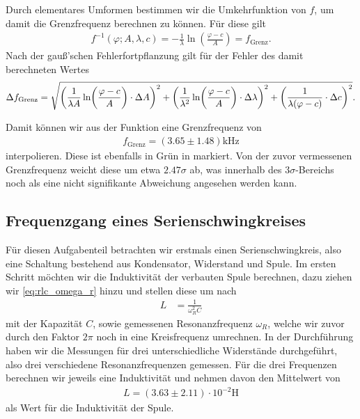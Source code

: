 Durch elementares Umformen bestimmen wir die Umkehrfunktion von $f$, um damit die Grenzfrequenz berechnen zu können. Für diese gilt
\begin{align}
  f^{-1}(\varphi; A, \lambda, c) = - \frac{1}{\lambda} \ln(\frac{\varphi - c}{A}) = f_{\mathrm{Grenz}}.
\end{align}
Nach der gauß'schen Fehlerfortpflanzung gilt für der Fehler des damit berechneten Wertes
\begin{align}
  \Delta f_{\mathrm{Grenz}} = \sqrt{\qty(\frac{1}{\lambda A} \ln(\frac{\varphi - c}{A}) \cdot \Delta A)^{2} + \qty(\frac{1}{\lambda^2} \ln(\frac{\varphi - c}{A}) \cdot \Delta \lambda)^{2} + \qty(\frac{1}{\lambda(\varphi - c)} \cdot \Delta c)^{2}}.
\end{align}

Damit können wir aus der Funktion eine Grenzfrequenz von
\begin{align}
  f_{\mathrm{Grenz}} = (3.65 \pm 1.48) \si{\kilo\hertz}
\end{align}
interpolieren. Diese ist ebenfalls in Grün in  markiert. Von der zuvor vermessenen Grenzfrequenz weicht diese um etwa $2.47\sigma$ ab, was innerhalb des $3\sigma$-Bereichs noch als eine nicht signifikante Abweichung angesehen werden kann.

\subsection{Frequenzgang eines Serienschwingkreises}

Für diesen Aufgabenteil betrachten wir erstmals einen Serienschwingkreis, also eine Schaltung bestehend aus Kondensator, Widerstand und Spule. Im ersten Schritt möchten wir die Induktivität der verbauten Spule berechnen, dazu ziehen wir \eqref{eq:rlc_omega_r} hinzu und stellen diese um nach
\begin{align}
  L &= \frac{1}{\omega_R^2 C}
\end{align}
mit der Kapazität $C$, sowie gemessenen Resonanzfrequenz $\omega_R$, welche wir zuvor durch den Faktor $2\pi$ noch in eine Kreisfrequenz umrechnen. In der Durchführung haben wir die Messungen für drei unterschiedliche Widerstände durchgeführt, also drei verschiedene Resonanzfrequenzen gemessen. Für die drei Frequenzen berechnen wir jeweils eine Induktivität und nehmen davon den Mittelwert von
\begin{align}
  L = (3.63 \pm 2.11) \cdot 10^{-2} \si{\henry}
\end{align}
als Wert für die Induktivität der Spule.

